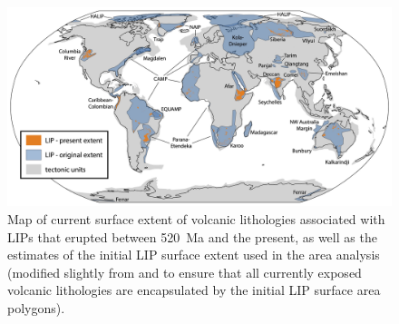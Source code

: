 \begin{figure}[h!]
\begin{center}
	\includegraphics[width=\textwidth]{figures/LIPs/LIP-map.jpg}
	\caption[Map of current surface extent of volcanic lithologies associated with large igneous provinces that erupted between 520~Ma and the present.]{Map of current surface extent of volcanic lithologies associated with LIPs that erupted between 520~Ma and the present, as well as the estimates of the initial LIP surface extent used in the area analysis (modified slightly from \citealp{Ernst2017a} and \citealp{Ernst2019a} to ensure that all currently exposed volcanic lithologies are encapsulated by the initial LIP surface area polygons).}
	\label{fig:LIP-map}
\end{center}
\end{figure}

